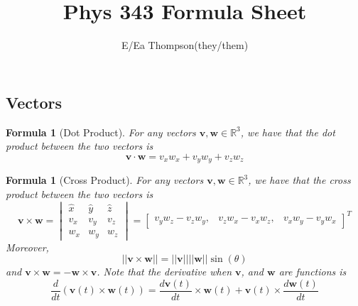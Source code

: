 \documentclass[12pt]{article}
\newtheorem{for}[thm]{Formula}
\theoremstyle{definition}
\theoremstyle{remark}
\numberwithin{equation}{section}
\newcommand\R{\mathbb R}    %
\newcommand\B[1]{\textbf{#1}}
\begin{document}

\title{Phys 343 Formula Sheet}
\author{E/Ea Thompson(they/them)}
\maketitle




\subsection{Vectors}


\begin{for}[Dot Product]
        For any vectors $\B{v},\B{w} \in \R^3$, we have that the dot product between the two vectors is 
        \begin{equation}
                \B{v}\cdot\B{w} = v_xw_x+v_yw_y+v_zw_z
        \end{equation}
\end{for}


\vspace{15pt}

\begin{for}[Cross Product]
        For any vectors $\B{v},\B{w} \in \R^3$, we have that the cross product between the two vectors is 
        \begin{equation}
                \B{v}\times\B{w} = \begin{vmatrix} \hat{x} & \hat{y} & \hat{z} \\
                        v_x & v_y & v_z \\
                        w_x & w_y & w_z 
                \end{vmatrix} = 
                        \begin{bmatrix} v_yw_z - v_zw_y, & v_zw_x - v_xw_z, & v_xw_y - v_yw_x
                \end{bmatrix}^T
        \end{equation}
        Moreover, \begin{equation}
                ||\B{v}\times\B{w}|| = ||\B{v}||||\B{w}||\sin(\theta)
        \end{equation}
        and $\B{v}\times \B{w} = -\B{w} \times \B{v}$. Note that the derivative when $\B{v}$, and $\B{w}$ are functions is \begin{equation}
                \frac{d}{dt}(\B{v}(t)\times \B{w}(t)) = \frac{d\B{v}(t)}{dt}\times\B{w}(t) + \B{v}(t)\times \frac{d\B{w}(t)}{dt}
        \end{equation}
\end{for}
\end{document}
